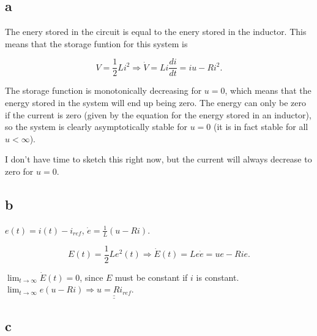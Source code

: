 \documentclass{article}
\begin{document}
\subsection{a}

The enery stored in the circuit is equal to the enery stored in the inductor. This means that the storage funtion for this system is 

\begin{equation*}
    V = \frac{1}{2} L i^2 \Rightarrow \dot V = Li\frac{di}{dt} = iu - Ri^2.
\end{equation*}

The storage function is monotonically decreasing for $u = 0$, which means that the energy stored in the system will end up being zero. The energy can only be zero if the current is zero (given by the equation for the energy stored in an inductor), so the system is clearly asymptotically stable for $u = 0$ (it is in fact stable for all $u < \infty$). 

I don't have time to sketch this right now, but the current will always decrease to zero for $u = 0$.

\subsection{b}

$e(t) = i(t) - i_{ref}$, $\dot e = \frac{1}{L}(u - Ri)$. 

\begin{equation*}
    E(t) = \frac{1}{2}Le^2(t) \Rightarrow \dot E(t) = Le\dot e = ue - Rie.
\end{equation*} 

$\lim_{t\to \infty} \dot E (t) = 0$, since $E$ must be constant if $i$ is constant. $\lim_{t\to \infty} e(u - Ri) \Rightarrow \underline{\underline{u = Ri_{ref}}}$.

\subsection{c}
\end{document}
